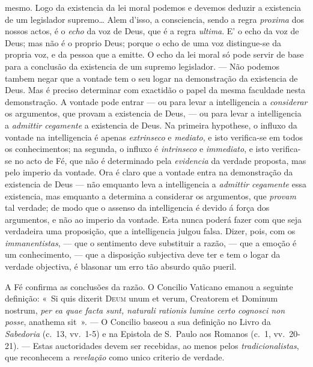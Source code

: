 {mesmo. Logo da existencia da lei moral podemos e devemos deduzir a existencia de um
legislador supremo\dots{} Alem d'isso, a consciencia, sendo a regra \emph{proxima} dos
nossos actos, é o \emph{echo} da voz de
Deus, que é a regra \emph{ultima}. E' o echo da voz de Deus; mas não é o proprio Deus;
porque o echo de uma voz distingue-se da propria voz, e da pessoa que a emitte. O echo
da lei moral só pode servir de base para a conclusão da existencia de um supremo
legislador. --- Não podemos tambem negar que a vontade tem o seu logar na demonstração
da existencia de Deus. Mas é preciso determinar com exactidão o papel da mesma
faculdade nesta demonstração. A vontade pode entrar --- ou para levar a intelligencia a
\emph{considerar} os argumentos, que provam a existencia de Deus, --- ou para levar a
intelligencia a \emph{admittir cegamente} a existencia de Deus. Na primeira hypothese,
o influxo da vontade na intelligencia é apenas \emph{extrinseco} e \emph{mediato}, e
isto verifica-se em todos os conhecimentos; na segunda, o influxo é \emph{intrinseco} e
\emph{immediato}, e isto verifica-se no acto de Fé, que não é determinado pela
\emph{evidencia} da verdade proposta, mas pelo imperio da vontade. Ora é claro que a
vontade entra na demonstração da existencia de Deus --- não emquanto leva a
intelligencia a \emph{admittir cegamente} essa existencia, mas emquanto a determina a
considerar os argumentos, que \emph{provam} tal verdade; de modo que o assenso da
intelligencia é devido á força dos argumentos, e não ao imperio da vontade. Esta nunca
poderá fazer com que seja verdadeira uma proposição, que a intelligencia julgou falsa.
Dizer, pois, com os \emph{immanentistas}, --- que o sentimento deve substituir a razão,
--- que a emoção é um conhecimento, --- que a disposição subjectiva deve ter e tem o
logar da verdade objectiva, é blasonar um erro tão absurdo quão pueril.

A Fé confirma as conclusões da razão. O Concilio Vaticano emanou a seguinte definição:
«~Si quis dixerit \textsc{Deum} unum et verum, Creatorem et Dominum nostrum, \emph{per
ea quae facta sunt, naturali rationis lumine certo cognosci non posse}, anathema
sit~». --- O Concilio baseou a sua definição no Livro da \emph{Sabedoria} (c.~13,
vv.~1-5) e na Epistola de S.~Paulo aos Romanos (c.~1, vv.~20-21). --- Estas
auctoridades devem ser recebidas, ao menos pelos \emph{tradicionalistas}, que
reconhecem a \emph{revelação} como unico criterio de verdade.}

